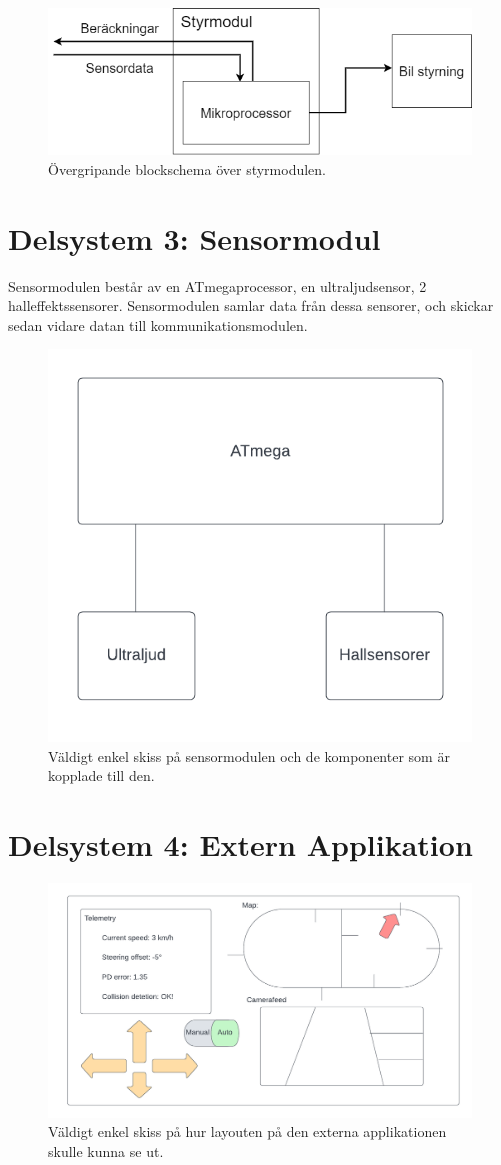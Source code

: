 \documentclass[10pt,oneside,swedish]{lips}
\begin{document}
\begin{figure}[htbp]
  \centering
  \includegraphics[width=.5\textwidth]{./Figures/styrmodul-projektskiss.png}
  \caption{Övergripande blockschema över styrmodulen.}
  \label{fig:styrmodul}
\end{figure}

\section{Delsystem 3: Sensormodul}
Sensormodulen består av en ATmegaprocessor, en ultraljudsensor, 2 halleffektssensorer. Sensormodulen samlar data från dessa sensorer, och skickar sedan vidare datan till kommunikationsmodulen.

\begin{figure}[htbp]
  \centering
  \includegraphics[width=.3\textwidth]{./Figures/Sensormodul.png}
  \caption{Väldigt enkel skiss på sensormodulen och de komponenter som är kopplade till den.}
  \label{fig:sensorskiss}
\end{figure}

\section{Delsystem 4: Extern Applikation}
\begin{figure}[htbp]
  \centering
  \includegraphics[width=.8\textwidth]{./Figures/appskiss.png}
  \caption{Väldigt enkel skiss på hur layouten på den externa applikationen skulle kunna se ut.}
  \label{fig:appskiss}
\end{figure}
\end{document}
